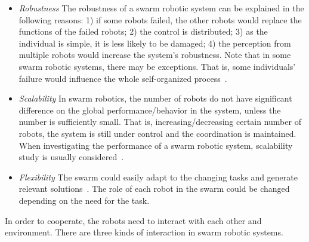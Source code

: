 \begin{itemize}

\item \textit{Robustness}  The robustness of a swarm robotic system can be explained in the following reasons: 1) if some robots failed, the other robots would replace the functions of the failed robots; 2) the control is distributed; 3) as the individual is simple, it is less likely to be damaged; 4) the perception from multiple robots would increase the system's robustness. Note that in some swarm robotic systems, there may be exceptions. That is, some individuals' failure would influence the whole self-organized process~\cite{Bjerknes2013}.

\item \textit{Scalability} In swarm robotics, the number of robots do not have significant difference on the global performance/behavior in the system, unless the number is sufficiently small. That is, increasing/decreasing certain number of robots, the system is still under control and the coordination is maintained. When investigating the performance of a swarm robotic system, scalability study is usually considered~\cite{Jianing:TRO:2015, Melvin_DARS2014}.

\item \textit{Flexibility} The swarm could easily adapt to the changing tasks and generate relevant solutions~\cite{Sahin:LNCS:2005}. The role of each robot in the swarm could be changed depending on the need for the task. 
\end{itemize}

In order to cooperate, the robots need to interact with each other and environment. There are three kinds of interaction in swarm robotic systems. 

